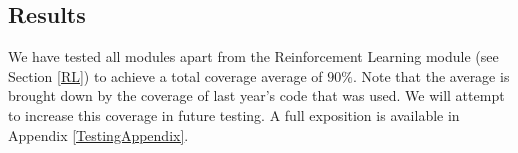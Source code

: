 \subsection{Results}
We have tested all modules apart from the Reinforcement Learning module (see Section \ref{RL}) to achieve a total coverage average of $90\%$. Note that the average is brought down by the coverage of last year's code that was used. We will attempt to increase this coverage in future testing. A full exposition is available in Appendix \ref{TestingAppendix}.